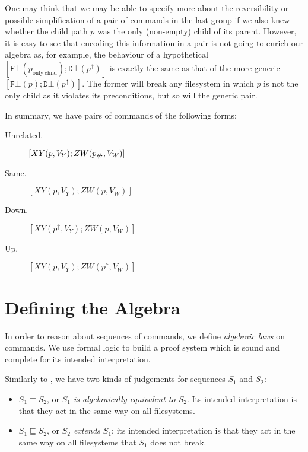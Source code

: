 \documentclass[12pt]{article}
\newcommand{\empt}{\bot}
\newcommand{\pp}{p^\uparrow} %
\newcommand{\np}{p_{\centernot\leftrightarrow}} %
\newcommand{\fscommand}[2]{{#1#2}}
\newcommand{\fsregcommandchar}[1]{\mathtt{#1}}
\newcommand{\fsregcommand}[2]{\fscommand{\fsregcommandchar{#1}}{\fsregcommandchar{#2}}}
\newcommand{\cfb}{\fsregcommand{F}{\empt}}
\newcommand{\cdb}{\fsregcommand{D}{\empt}}
\newcommand{\cxy}{\fscommand{X}{Y}}
\newcommand{\czw}{\fscommand{Z}{W}}
\newcommand{\eqext}{\sqsubseteq}
\begin{document}
One may think that we may be able to specify more about the reversibility
or possible simplification of a pair of commands in the last group if we also
knew whether the child path $p$ was the only (non-empty) child of its parent.
However, it is easy to see that encoding this information in a pair
is not going to enrich our algebra as, for example,
the behaviour of a hypothetical $[\cfb(p_{\mathrm{only\ child}}); \cdb(\pp)]$
is exactly the same as that of the more generic
$[\cfb(p); \cdb(\pp)]$. The former will break any filesystem in which
$p$ is not the only child as it violates its preconditions, but so will
the generic pair.


In summary, we have pairs of commands
of the following forms:
\begin{description}
\item[Unrelated.] \( [\cxy(p,V_Y); \czw(\np,V_W)] \)
\item[Same.] \( [\cxy(p,V_Y); \czw(p,V_W)] \)
\item[Down.] \( [\cxy(\pp,V_Y); \czw(p,V_W)] \)
\item[Up.] \( [\cxy(p,V_Y); \czw(\pp,V_W)] \)
\end{description}


\section{Defining the Algebra}

In order to reason about sequences of commands, we define \emph{algebraic laws} on
commands. We use formal logic to build a proof system which is sound and
complete for its intended interpretation.

Similarly to \cite{NREC:alg}, we have two kinds of judgements
for sequences \(S_1\) and \(S_2\):
\begin{itemize}
\item \(S_1\equiv S_2\), or \emph{\(S_1\) is algebraically equivalent to
\(S_2\)}. Its intended interpretation is that they act in the same way on all
filesystems.
\item \(S_1\eqext S_2\), or \emph{\(S_2\) extends \(S_1\)}; its intended
interpretation is that they act in the same way on all
filesystems that \(S_1\) does not break.
\end{itemize}
\end{document}
